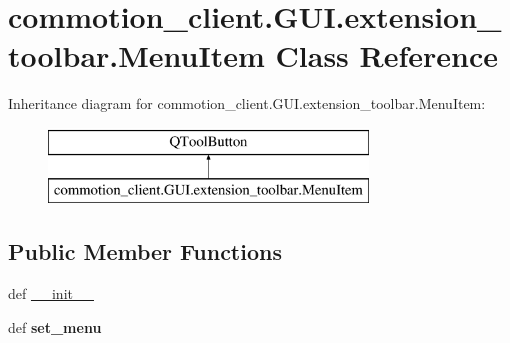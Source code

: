 \hypertarget{classcommotion__client_1_1GUI_1_1extension__toolbar_1_1MenuItem}{\section{commotion\-\_\-client.\-G\-U\-I.\-extension\-\_\-toolbar.\-Menu\-Item Class Reference}
\label{classcommotion__client_1_1GUI_1_1extension__toolbar_1_1MenuItem}
}
Inheritance diagram for commotion\-\_\-client.\-G\-U\-I.\-extension\-\_\-toolbar.\-Menu\-Item\-:\begin{figure}[H]
\begin{center}
\leavevmode
\includegraphics[height=2.000000cm]{classcommotion__client_1_1GUI_1_1extension__toolbar_1_1MenuItem}
\end{center}
\end{figure}
\subsection*{Public Member Functions}
\begin{DoxyCompactItemize}
\item 
def \hyperlink{classcommotion__client_1_1GUI_1_1extension__toolbar_1_1MenuItem_a111f98709fa79a9be8bdeed5722a9b69}{\-\_\-\-\_\-init\-\_\-\-\_\-}
\item 
\hypertarget{classcommotion__client_1_1GUI_1_1extension__toolbar_1_1MenuItem_a59af7fe77b05243a1ca6a4821565d8f2}{def {\bfseries set\-\_\-menu}}\label{classcommotion__client_1_1GUI_1_1extension__toolbar_1_1MenuItem_a59af7fe77b05243a1ca6a4821565d8f2}

\end{DoxyCompactItemize}
